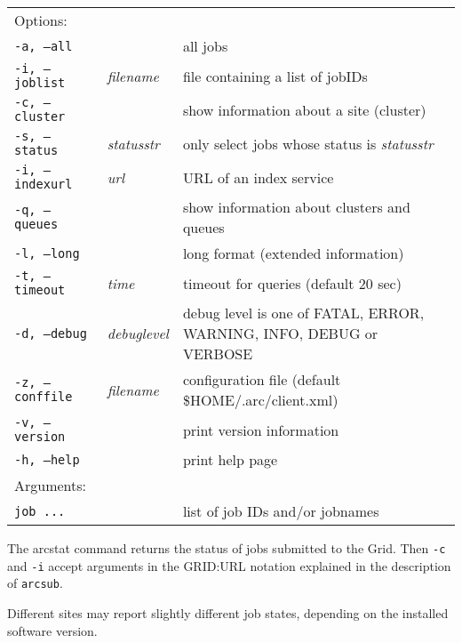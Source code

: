 \begin{shaded}
\end{shaded}
\begin{longtable}{llp{8cm}}
   Options:&&\\
   \texttt{-a, --all}& & all jobs\\
   \texttt{-i, --joblist}& \textit{filename}& file containing a list of jobIDs\\
   \texttt{-c, --cluster}& & show information about a site (cluster)\\
   \texttt{-s, --status}& \textit{statusstr} &only select jobs whose status is \textit{statusstr}\\
   \texttt{-i, --indexurl}& \textit{url} &URL of an index service\\
   \texttt{-q, --queues}&&show information about clusters and queues\\
   \texttt{-l, --long}& & long format (extended information)\\
   \texttt{-t, --timeout}& \textit{time}& timeout for queries (default 20 sec)\\
   \texttt{-d, --debug}& \textit{debuglevel}&debug level is one of  FATAL, ERROR, WARNING, INFO, DEBUG or VERBOSE\\
   \texttt{-z, --conffile}&\textit{filename}& configuration file (default {\$}HOME/.arc/client.xml)\\
   \texttt{-v, --version}& & print version information\\
   \texttt{-h, --help}& & print help page\\
   Arguments:&&\\
   \texttt{job ...} && list of job IDs and/or jobnames\\
\end{longtable}

The arcstat command returns the status of jobs submitted to the Grid. Then \texttt{-c} and \texttt{-i} accept arguments in the GRID:URL notation explained in the description of \texttt{arcsub}.

Different sites may report slightly different job states, depending on
the installed software version.%


